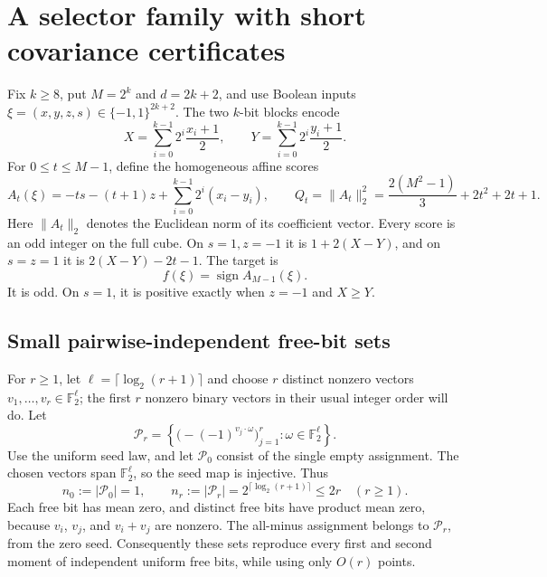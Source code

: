 \section{A selector family with short covariance certificates}
\label{sec:selector}

Fix $k\ge8$, put $M=2^k$ and $d=2k+2$, and use Boolean inputs
$\xi=(x,y,z,s)\in\{-1,1\}^{2k+2}$.  The two $k$-bit blocks encode
\[
 X=\sum_{i=0}^{k-1}2^i\frac{x_i+1}{2},\qquad
 Y=\sum_{i=0}^{k-1}2^i\frac{y_i+1}{2}.
\]
For $0\le t\le M-1$, define the homogeneous affine scores
\begin{equation}\label{eq:selector-score}
 A_t(\xi)=-ts-(t+1)z+\sum_{i=0}^{k-1}2^i(x_i-y_i),
 \qquad
 Q_t=\|A_t\|_2^2=\frac{2(M^2-1)}3+2t^2+2t+1.
\end{equation}
Here $\|A_t\|_2$ denotes the Euclidean norm of its coefficient vector.
Every score is an odd integer on the full cube. On $s=1,z=-1$ it is
$1+2(X-Y)$, and on $s=z=1$ it is $2(X-Y)-2t-1$.
The target is
\begin{equation}\label{eq:selector-target}
 f(\xi)=\operatorname{sign} A_{M-1}(\xi).
\end{equation}
It is odd. On $s=1$, it is positive exactly when $z=-1$ and $X\ge Y$.

\subsection{Small pairwise-independent free-bit sets}

For $r\ge1$, let $\ell=\lceil\log_2(r+1)\rceil$ and choose $r$ distinct
nonzero vectors $v_1,\ldots,v_r\in\mathbb F_2^\ell$; the first $r$
nonzero binary vectors in their usual integer order will do. Let
\[
 \mathcal P_r=
 \left\{\bigl(-(-1)^{v_j\cdot\omega}\bigr)_{j=1}^r:
                  \omega\in\mathbb F_2^\ell\right\}.
\]
Use the uniform seed law, and let $\mathcal P_0$ consist of the single
empty assignment. The chosen vectors span $\mathbb F_2^\ell$, so the
seed map is injective. Thus
\begin{equation}\label{eq:pi-size}
 n_0:=|\mathcal P_0|=1,\qquad
 n_r:=|\mathcal P_r|=2^{\lceil\log_2(r+1)\rceil}\le2r
 \quad(r\ge1).
\end{equation}
Each free bit has mean zero, and distinct free bits have product mean
zero, because $v_i$, $v_j$, and $v_i+v_j$ are nonzero. The all-minus
assignment belongs to $\mathcal P_r$, from the zero seed. Consequently
these sets reproduce every first and second moment of independent
uniform free bits, while using only $O(r)$ points.

